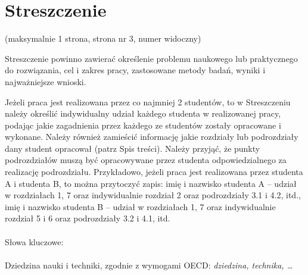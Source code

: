 \chapter*{Streszczenie}
\thispagestyle{plain}

(maksymalnie 1 strona, strona nr 3, numer widoczny)

Streszczenie powinno zawierać określenie problemu naukowego lub praktycznego do rozwiązania, cel i zakres pracy, zastosowane metody badań, wyniki i najważniejsze wnioski.

Jeżeli praca jest realizowana przez co najmniej 2 studentów, to w Streszczeniu należy określić indywidualny udział każdego studenta w realizowanej pracy, podając jakie zagadnienia przez każdego ze studentów zostały opracowane i wykonane. Należy również zamieścić informację jakie rozdziały lub podrozdziały dany student opracował (patrz Spis treści). Należy przyjąć, że punkty podrozdziałów muszą być opracowywane przez studenta odpowiedzialnego za realizację podrozdziału. Przykładowo, jeżeli praca jest realizowana przez studenta A i studenta B, to można przytoczyć zapis: imię i nazwisko studenta A – udział w rozdziałach 1, 7 oraz indywidualnie rozdział 2 oraz podrozdziały 3.1 i 4.2, itd., imię i nazwisko studenta B – udział w rozdziałach 1, 7 oraz indywidualnie rozdział 5 i 6 oraz podrozdziały 3.2 i 4.1, itd.
\\\\
Słowa kluczowe:
\\\\
Dziedzina nauki i techniki, zgodnie z wymogami OECD: \emph{dziedzina, technika, …}
